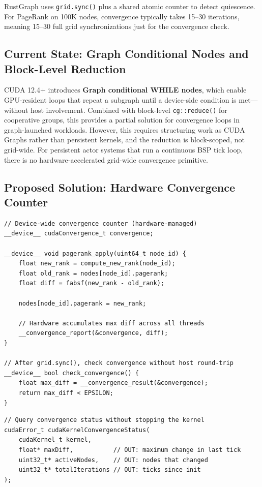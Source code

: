 \documentclass[11pt,a4paper]{article}
\begin{document}
RustGraph uses \texttt{grid.sync()} plus a shared atomic counter to detect quiescence. For PageRank on 100K nodes, convergence typically takes 15--30 iterations, meaning 15--30 full grid synchronizations just for the convergence check.

\subsection{Current State: Graph Conditional Nodes and Block-Level Reduction}

CUDA 12.4+ introduces \textbf{Graph conditional WHILE nodes}, which enable GPU-resident loops that repeat a subgraph until a device-side condition is met---without host involvement. Combined with block-level \texttt{cg::reduce()} for cooperative groups, this provides a partial solution for convergence loops in graph-launched workloads. However, this requires structuring work as CUDA Graphs rather than persistent kernels, and the reduction is block-scoped, not grid-wide. For persistent actor systems that run a continuous BSP tick loop, there is no hardware-accelerated grid-wide convergence primitive.

\subsection{Proposed Solution: Hardware Convergence Counter}

\begin{lstlisting}[style=cstyle,title={Hardware convergence detection}]
// Device-wide convergence counter (hardware-managed)
__device__ cudaConvergence_t convergence;

__device__ void pagerank_apply(uint64_t node_id) {
    float new_rank = compute_new_rank(node_id);
    float old_rank = nodes[node_id].pagerank;
    float diff = fabsf(new_rank - old_rank);

    nodes[node_id].pagerank = new_rank;

    // Hardware accumulates max diff across all threads
    __convergence_report(&convergence, diff);
}

// After grid.sync(), check convergence without host round-trip
__device__ bool check_convergence() {
    float max_diff = __convergence_result(&convergence);
    return max_diff < EPSILON;
}
\end{lstlisting}

\begin{lstlisting}[style=cstyle,title={Host-side API}]
// Query convergence status without stopping the kernel
cudaError_t cudaKernelConvergenceStatus(
    cudaKernel_t kernel,
    float* maxDiff,           // OUT: maximum change in last tick
    uint32_t* activeNodes,    // OUT: nodes that changed
    uint32_t* totalIterations // OUT: ticks since init
);
\end{lstlisting}
\end{document}
